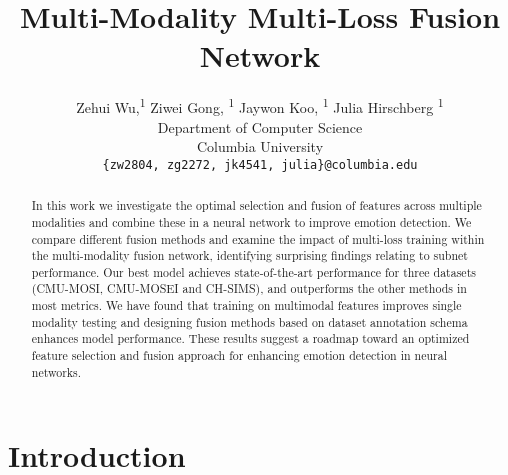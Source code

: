 \documentclass[11pt]{article}
\title{Multi-Modality Multi-Loss Fusion Network}
\author {
    Zehui Wu\footnotemark[1],\textsuperscript{\rm 1}
    Ziwei Gong\footnotemark[1], \textsuperscript{\rm 1}
    Jaywon Koo, \textsuperscript{\rm 1}
    Julia Hirschberg \textsuperscript{\rm 1}\\
  Department of Computer Science\\Columbia University\\
  \texttt{\{zw2804, zg2272, jk4541, julia\}@columbia.edu} 
}
\begin{document}
\maketitle
\renewcommand{\thefootnote}{\fnsymbol{footnote}} 
\begin{abstract}
In this work we investigate the optimal selection and fusion of features across multiple modalities and combine these in a neural network to improve emotion detection. We compare different fusion methods and examine the impact of multi-loss training within the multi-modality fusion network, identifying surprising findings relating to subnet performance. Our best model achieves state-of-the-art performance for three datasets (CMU-MOSI, CMU-MOSEI and CH-SIMS), and outperforms the other methods in most metrics. We have found that training on multimodal features improves single modality testing and designing fusion methods based on dataset annotation schema enhances model performance. These results suggest a roadmap toward an optimized feature selection and fusion approach for enhancing emotion detection in neural networks.


\end{abstract}

\section{Introduction}


\end{document}
